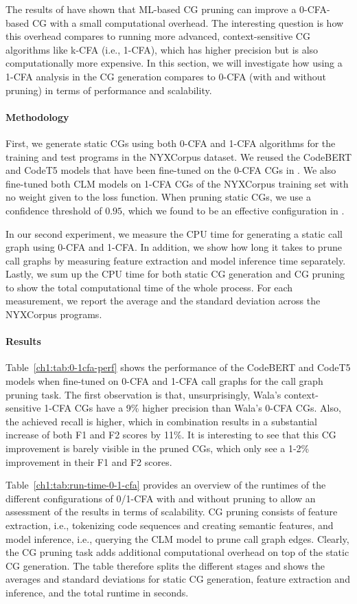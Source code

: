 The results of  have shown that ML-based CG pruning can improve a 0-CFA-based CG with a small computational overhead.
The interesting question is how this overhead compares to running more advanced, context-sensitive CG algorithms like k-CFA (i.e., 1-CFA), which has higher precision but is also computationally more expensive.
In this section, we will investigate how using a 1-CFA analysis in the CG generation compares to 0-CFA (with and without pruning) in terms of performance and scalability.

\paragraph{Methodology}
First, we generate static CGs using both 0-CFA and 1-CFA algorithms for the training and test programs in the NYXCorpus dataset.
We reused the CodeBERT and CodeT5 models that have been fine-tuned on the 0-CFA CGs in .
We also fine-tuned both CLM models on 1-CFA CGs of the NYXCorpus training set with no weight given to the loss function.
When pruning static CGs, we use a confidence threshold of $0.95$, which we found to be an effective configuration in .

In our second experiment, we measure the CPU time for generating a static call graph using 0-CFA and 1-CFA. In addition, we show how long it takes to prune call graphs by measuring feature extraction and model inference time separately. Lastly, we sum up the CPU time for both static CG generation and CG pruning to show the total computational time of the whole process.
For each measurement, we report the average and the standard deviation across the NYXCorpus programs. 

\paragraph{Results}
Table~\ref{ch1:tab:0-1cfa-perf} shows the performance of the CodeBERT and CodeT5 models when fine-tuned on 0-CFA and 1-CFA call graphs for the call graph pruning task. The first observation is that, unsurprisingly, Wala's context-sensitive 1-CFA CGs have a 9\% higher precision than Wala's 0-CFA CGs.
Also, the achieved recall is higher, which in combination results in a substantial increase of both F1 and F2 scores by 11\%.
It is interesting to see that this CG improvement is barely visible in the pruned CGs, which only see a 1-2\% improvement in their F1 and F2 scores.

Table~\ref{ch1:tab:run-time-0-1-cfa} provides an overview of the runtimes of the different configurations of 0/1-CFA with and without pruning to allow an assessment of the results in terms of scalability.
CG pruning consists of feature extraction, i.e., tokenizing code sequences and creating semantic features, and model inference, i.e., querying the CLM model to prune call graph edges.
Clearly, the CG pruning task adds additional computational overhead on top of the static CG generation.
The table therefore splits the different stages and shows the averages and standard deviations for static CG generation, feature extraction and inference, and the total runtime in seconds.

